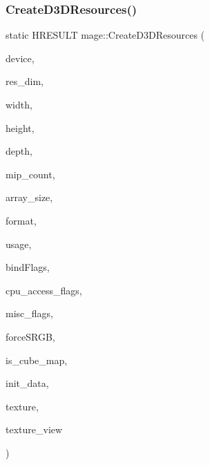 \subsubsection{\texorpdfstring{Create\+D3\+D\+Resources()}{CreateD3DResources()}}
{\footnotesize\ttfamily static H\+R\+E\+S\+U\+LT mage\+::\+Create\+D3\+D\+Resources (\begin{DoxyParamCaption}\item[{\+\_\+\+In\+\_\+ I\+D3\+D11\+Device2 $\ast$}]{device,  }\item[{\+\_\+\+In\+\_\+ uint32\+\_\+t}]{res\+\_\+dim,  }\item[{\+\_\+\+In\+\_\+ size\+\_\+t}]{width,  }\item[{\+\_\+\+In\+\_\+ size\+\_\+t}]{height,  }\item[{\+\_\+\+In\+\_\+ size\+\_\+t}]{depth,  }\item[{\+\_\+\+In\+\_\+ size\+\_\+t}]{mip\+\_\+count,  }\item[{\+\_\+\+In\+\_\+ size\+\_\+t}]{array\+\_\+size,  }\item[{\+\_\+\+In\+\_\+ D\+X\+G\+I\+\_\+\+F\+O\+R\+M\+AT}]{format,  }\item[{\+\_\+\+In\+\_\+ D3\+D11\+\_\+\+U\+S\+A\+GE}]{usage,  }\item[{\+\_\+\+In\+\_\+ uint32\+\_\+t}]{bind\+Flags,  }\item[{\+\_\+\+In\+\_\+ uint32\+\_\+t}]{cpu\+\_\+access\+\_\+flags,  }\item[{\+\_\+\+In\+\_\+ uint32\+\_\+t}]{misc\+\_\+flags,  }\item[{\+\_\+\+In\+\_\+ bool}]{force\+S\+R\+GB,  }\item[{\+\_\+\+In\+\_\+ bool}]{is\+\_\+cube\+\_\+map,  }\item[{\+\_\+\+In\+\_\+reads\+\_\+opt\+\_\+(mip\+\_\+count $\ast$array\+\_\+size) D3\+D11\+\_\+\+S\+U\+B\+R\+E\+S\+O\+U\+R\+C\+E\+\_\+\+D\+A\+TA $\ast$}]{init\+\_\+data,  }\item[{\+\_\+\+Outptr\+\_\+opt\+\_\+ I\+D3\+D11\+Resource $\ast$$\ast$}]{texture,  }\item[{\+\_\+\+Outptr\+\_\+opt\+\_\+ I\+D3\+D11\+Shader\+Resource\+View $\ast$$\ast$}]{texture\+\_\+view }\end{DoxyParamCaption})\hspace{0.3cm}{\ttfamily [static]}}

\hypertarget{namespacemage_a9ebb3d4391bb4b5b1393fc1efce57d8e}{}\label{namespacemage_a9ebb3d4391bb4b5b1393fc1efce57d8e} 
